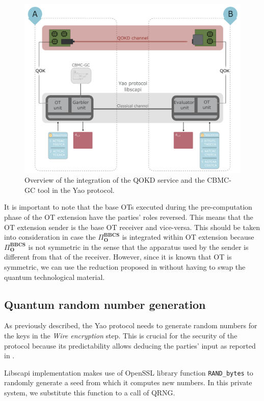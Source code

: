 \begin{figure}[h]
    \centering
    \includegraphics[scale=0.9]{Chapter_PrivatePhylogeneticTrees/QOKD.png}
    \caption{Overview of the integration of the QOKD service and the CBMC-GC tool in the Yao protocol.}
    \label{fig:QOKD}
\end{figure}

It is important to note that the base OTs executed during the pre-computation phase of the OT extension have the parties' roles reversed. This means that the OT extension sender is the base OT receiver and vice-versa. This should be taken into consideration in case the $\Pi^{\textbf{BBCS}}_{\textbf{O}}$ is integrated within OT extension because $\Pi^{\textbf{BBCS}}_{\textbf{O}}$ is not symmetric in the sense that the apparatus used by the sender is different from that of the receiver. However, since it is known that OT is symmetric, we can use the reduction proposed in \cite{Wolf2006} without having to swap the quantum technological material.

\subsection{Quantum random number generation} 

As previously described, the Yao protocol needs to generate random numbers for the keys in the \textit{Wire encryption} step. This is crucial for the security of the protocol because its predictability allows deducing the parties' input as reported in \cite{ALSZ13}. 

Libscapi implementation makes use of OpenSSL library function \texttt{RAND\_bytes} to randomly generate a seed from which it computes new numbers. In this private system, we substitute this function to a call of QRNG.

